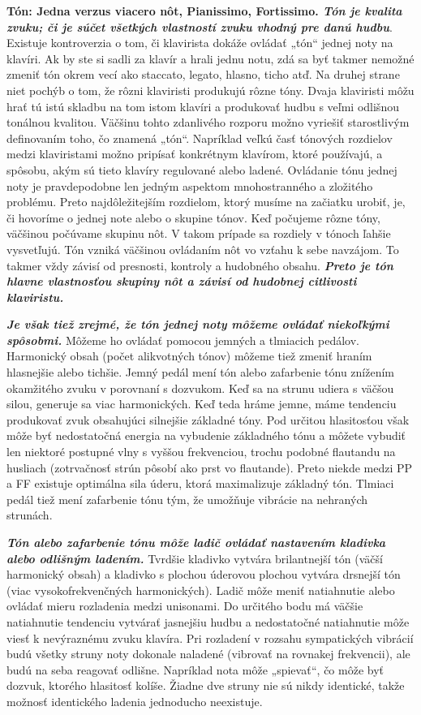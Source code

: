 \documentclass[11pt,a4paper%
]{book}
\begin{document}
\textbf{Tón: Jedna verzus viacero nôt, Pianissimo, Fortissimo. \emph{Tón je kvalita zvuku; či je súčet všetkých vlastností zvuku vhodný pre danú hudbu}}. Existuje kontroverzia o tom, či klavirista dokáže ovládať „tón`` jednej noty na klavíri. Ak by ste si sadli za klavír a hrali jednu notu, zdá sa byť takmer nemožné zmeniť tón okrem vecí ako staccato, legato, hlasno, ticho atď. Na druhej strane niet pochýb o tom, že rôzni klaviristi produkujú rôzne tóny. Dvaja klaviristi môžu hrať tú istú skladbu na tom istom klavíri a produkovať hudbu s veľmi odlišnou tonálnou kvalitou. Väčšinu tohto zdanlivého rozporu možno vyriešiť starostlivým definovaním toho, čo znamená „tón``. Napríklad veľkú časť tónových rozdielov medzi klaviristami možno pripísať konkrétnym klavírom, ktoré používajú, a spôsobu, akým sú tieto klavíry regulované alebo ladené. Ovládanie tónu jednej noty je pravdepodobne len jedným aspektom mnohostranného a zložitého problému. Preto najdôležitejším rozdielom, ktorý musíme na začiatku urobiť, je, či hovoríme o jednej note alebo o skupine tónov. Keď počujeme rôzne tóny, väčšinou počúvame skupinu nôt. V takom prípade sa rozdiely v tónoch ľahšie vysvetľujú. Tón vzniká väčšinou ovládaním nôt vo vzťahu k sebe navzájom. To takmer vždy závisí od presnosti, kontroly a hudobného obsahu. \emph{\textbf{Preto je tón hlavne vlastnosťou skupiny nôt a závisí od hudobnej citlivosti klaviristu.}}

\emph{\textbf{Je však tiež zrejmé, že tón jednej noty môžeme ovládať niekoľkými spôsobmi.}} Môžeme ho ovládať pomocou jemných a tlmiacich pedálov. Harmonický obsah (počet alikvotných tónov) môžeme tiež zmeniť hraním hlasnejšie alebo tichšie. Jemný pedál mení tón alebo zafarbenie tónu znížením okamžitého zvuku v porovnaní s dozvukom. Keď sa na strunu udiera s väčšou silou, generuje sa viac harmonických. Keď teda hráme jemne, máme tendenciu produkovať zvuk obsahujúci silnejšie základné tóny. Pod určitou hlasitosťou však môže byť nedostatočná energia na vybudenie základného tónu a môžete vybudiť len niektoré postupné vlny s vyššou frekvenciou, trochu podobné flautandu na husliach (zotrvačnosť strún pôsobí ako prst vo flautande). Preto niekde medzi PP a FF existuje optimálna sila úderu, ktorá maximalizuje základný tón. Tlmiaci pedál tiež mení zafarbenie tónu tým, že umožňuje vibrácie na nehraných strunách.

\emph{\textbf{Tón alebo zafarbenie tónu môže ladič ovládať nastavením kladivka alebo odlišným ladením.}} Tvrdšie kladivko vytvára brilantnejší tón (väčší harmonický obsah) a kladivko s plochou úderovou plochou vytvára drsnejší tón (viac vysokofrekvenčných harmonických). Ladič môže meniť natiahnutie alebo ovládať mieru rozladenia medzi unisonami. Do určitého bodu má väčšie natiahnutie tendenciu vytvárať jasnejšiu hudbu a nedostatočné natiahnutie môže viesť k nevýraznému zvuku klavíra. Pri rozladení v rozsahu sympatických vibrácií budú všetky struny noty dokonale naladené (vibrovať na rovnakej frekvencii), ale budú na seba reagovať odlišne. Napríklad nota môže „spievať``, čo môže byť dozvuk, ktorého hlasitosť kolíše. Žiadne dve struny nie sú nikdy identické, takže možnosť identického ladenia jednoducho neexistuje.
\end{document}
